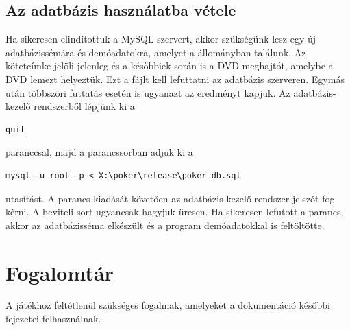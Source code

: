 \subsection{Az adatbázis használatba vétele}
Ha sikeresen elindítottuk a MySQL szervert, akkor szükségünk lesz egy új adatbázissémára és demóadatokra, amelyet a  állományban találunk. Az  kötetcímke jelöli jelenleg és a későbbiek során is a DVD meghajtót, amelybe a DVD lemezt helyeztük. Ezt a fájlt kell lefuttatni az adatbázis szerveren. Egymás után többszöri futtatás esetén is ugyanazt az eredményt kapjuk. Az adatbázis-kezelő rendszerből lépjünk ki a 
\begin{Verbatim}[xleftmargin=.5in]
quit
\end{Verbatim}
paranccsal, majd a parancssorban adjuk ki a
 \begin{Verbatim}[xleftmargin=.5in]
mysql -u root -p < X:\poker\release\poker-db.sql
\end{Verbatim}
utasítást. A parancs kiadását követően az adatbázis-kezelő rendszer jelszót fog kérni. A beviteli sort ugyancsak hagyjuk üresen. Ha sikeresen lefutott a parancs, akkor az adatbázisséma elkészült és a program demóadatokkal is feltöltötte.

\section{Fogalomtár}
A játékhoz feltétlenül szükséges fogalmak, amelyeket a dokumentáció későbbi fejezetei felhasználnak.
